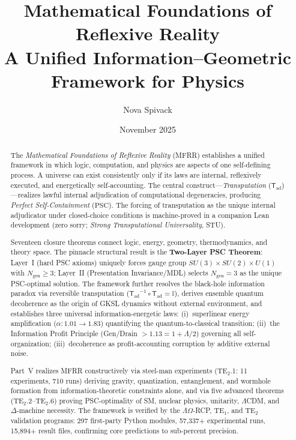\documentclass[11pt]{article}
\title{\textbf{Mathematical Foundations of Reflexive Reality}\\[0.5em]
\large A Unified Information--Geometric Framework for Physics}
\author{Nova Spivack}
\date{November 2025}
\newcommand{\Trans}{\ensuremath{{\mathsf{T}_{\mathrm{ad}}}}}
\newcommand{\PSC}{\text{PSC}}
\begin{document}
\maketitle
\NovaZenodoAfterTitle

\begin{abstract}
\noindent
The \emph{Mathematical Foundations of Reflexive Reality} (MFRR) establishes a unified framework in which logic, computation, and physics are aspects of one self-defining process.
A universe can exist consistently only if its laws are internal, reflexively executed, and energetically self-accounting.
The central construct---\emph{Transputation} (\( \Trans \))---realizes lawful internal adjudication of computational degeneracies, producing \emph{Perfect Self-Containment} (\( \PSC \)).
The forcing of transputation as the unique internal adjudicator under closed-choice conditions is machine-proved in a companion Lean development (zero sorry; \emph{Strong Transputational Universality}, STU).

Seventeen closure theorems connect logic, energy, geometry, thermodynamics, and theory space.
The pinnacle structural result is the \textbf{Two-Layer PSC Theorem}: Layer~I (hard PSC axioms) uniquely forces gauge group $SU(3)\times SU(2)\times U(1)$ with $N_{\mathrm{gen}}\ge 3$; Layer~II (Presentation Invariance/MDL) selects $N_{\mathrm{gen}}=3$ as the unique PSC-optimal solution.
The framework further resolves the black-hole information paradox via reversible transputation ($\Trans^{-1}\circ\Trans=\mathbb{I}$), derives ensemble quantum decoherence as the origin of GKSL dynamics without external environment, and establishes three universal information-energetic laws: (i)~superlinear energy amplification ($\alpha: 1.01\to 1.83$) quantifying the quantum-to-classical transition; (ii)~the Information Profit Principle (Gen/Drain $>1.13=1+\Lambda/2$) governing all self-organization; (iii)~decoherence as profit-accounting corruption by additive external noise.

Part~V realizes MFRR constructively via steel-man experiments (TE$_2$.1: 11 experiments, 710 runs) deriving gravity, quantization, entanglement, and wormhole formation from information-theoretic constraints alone, and via five advanced theorems (TE$_2$.2--TE$_2$.6) proving PSC-optimality of SM, nuclear physics, unitarity, $\Lambda$CDM, and $\Delta$-machine necessity.
The framework is verified by the $\Lambda\Omega$-RCP, TE$_1$, and TE$_2$ validation programs: 297 first-party Python modules, 57,337+ experimental runs, 15,894+ result files, confirming core predictions to sub-percent precision.
\end{abstract}
\end{document}
